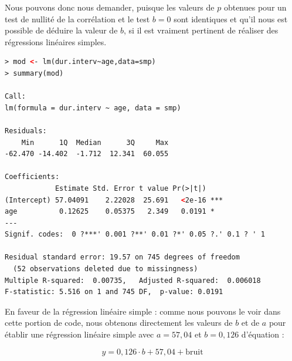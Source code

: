 Nous pouvons donc nous demander, puisque les valeurs de $p$ obtenues pour un test de nullité de la corrélation et le test $b=0$ sont identiques et qu'il nous est possible de déduire la valeur de $b$, si il est vraiment pertinent de réaliser des régressions linéaires simples.\newline 
\begin{lstlisting}[language=html]
> mod <- lm(dur.interv~age,data=smp)
> summary(mod)

Call:
lm(formula = dur.interv ~ age, data = smp)

Residuals:
    Min      1Q  Median      3Q     Max 
-62.470 -14.402  -1.712  12.341  60.055 

Coefficients:
            Estimate Std. Error t value Pr(>|t|)    
(Intercept) 57.04091    2.22028  25.691   <2e-16 ***
age          0.12625    0.05375   2.349   0.0191 *  
---
Signif. codes:  0 ?***' 0.001 ?**' 0.01 ?*' 0.05 ?.' 0.1 ? ' 1

Residual standard error: 19.57 on 745 degrees of freedom
  (52 observations deleted due to missingness)
Multiple R-squared:  0.00735,	Adjusted R-squared:  0.006018 
F-statistic: 5.516 on 1 and 745 DF,  p-value: 0.0191
\end{lstlisting}

En faveur de la régression linéaire simple : comme nous pouvons le voir dans cette portion de code, nous obtenons directement les valeurs de $b$ et de $a$ pour établir une régression linéaire simple avec $a=57,04$ et $b=0,126$ d'équation : 

$$y = 0,126\cdot b + 57,04 + \textrm{bruit}$$

